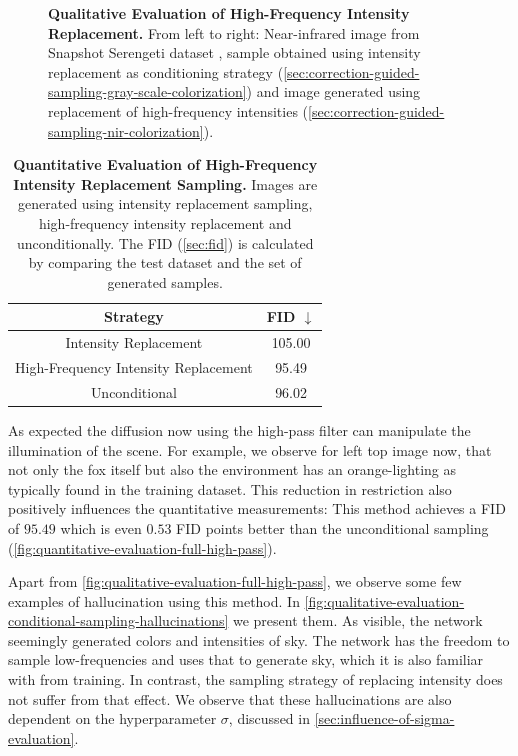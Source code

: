 \begin{figure}[htp!]
\begin{tabularx}{\textwidth}{Y Y Y !{\space} Y Y Y}
    \end{tabularx}
    \caption{
        \textbf{Qualitative Evaluation of High-Frequency Intensity Replacement.}
        From left to right:
        Near-infrared image from Snapshot Serengeti dataset \parencite{serengeti},
        sample obtained using intensity replacement as conditioning strategy (\autoref{sec:correction-guided-sampling-gray-scale-colorization})
        and
        image generated using replacement of high-frequency intensities (\autoref{sec:correction-guided-sampling-nir-colorization}).
    }
    \label{fig:qualitative-evaluation-full-high-pass}
\end{figure}

\begin{table}[htp!]
    \centering
    \begin{tabular}{c | c}
        Strategy                             & FID  $\downarrow$ \\
        \hline\hline
        Intensity Replacement                & 105.00            \\
        High-Frequency Intensity Replacement & 95.49             \\
        Unconditional                        & 96.02
    \end{tabular}
    \caption{
        \textbf{Quantitative Evaluation of High-Frequency Intensity Replacement Sampling.}
        Images are generated using intensity replacement sampling, high-frequency intensity replacement and unconditionally.
        The FID (\autoref{sec:fid}) \parencite{ttur} is calculated by comparing the test dataset and the set of generated samples.
    }
    \label{fig:quantitative-evaluation-full-high-pass}
\end{table}


As expected the diffusion now using the high-pass filter can manipulate the illumination of the scene.
For example, we observe for left top image now, that not only the fox itself but also the environment has an orange-lighting as typically found in the training dataset.
This reduction in restriction also positively influences the quantitative measurements:
This method achieves a FID of $95.49$ which is even $0.53$ FID points better than the unconditional sampling (\autoref{fig:quantitative-evaluation-full-high-pass}).

Apart from \autoref{fig:qualitative-evaluation-full-high-pass}, we observe some few examples of hallucination using this method.
In \autoref{fig:qualitative-evaluation-conditional-sampling-hallucinations} we present them.
As visible, the network seemingly generated colors and intensities of sky.
The network has the freedom to sample low-frequencies and uses that to generate sky, which it is also familiar with from training.
In contrast, the sampling strategy of replacing intensity does not suffer from that effect.
We observe that these hallucinations are also dependent on the hyperparameter $\sigma$, discussed in \autoref{sec:influence-of-sigma-evaluation}.

